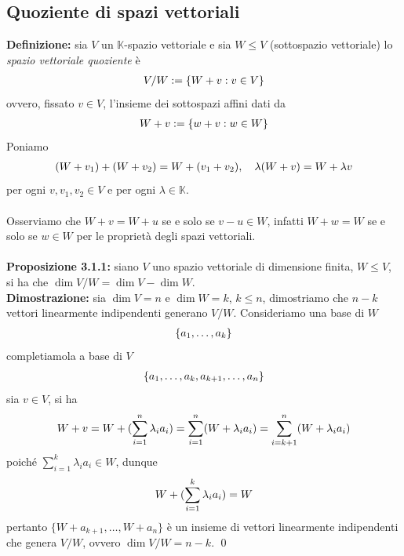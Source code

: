 \documentclass{article}
\begin{document}
\subsection{Quoziente di spazi vettoriali}
\textbf{Definizione:} sia $V$ un $\mathbb{K}$-spazio vettoriale e sia $W \leq V$ (sottospazio vettoriale) lo \textit{spazio vettoriale quoziente} è
\begin{gather}
    V/W := \{ W + v : v \in V \} \notag
\end{gather}
ovvero, fissato $v \in V$, l'insieme dei sottospazi affini dati da
\begin{gather}
    W + v := \{ w + v : w \in W \} \notag
\end{gather}
Poniamo
\begin{gather}
    (W + v_1) + (W + v_2) = W + (v_1 + v_2), \quad \lambda(W + v) = W + \lambda v \notag
\end{gather}
per ogni $v, v_1, v_2 \in V$ e per ogni $\lambda \in \mathbb{K}$. \\ \\
Osserviamo che $W + v = W + u$ se e solo se $v - u \in W$, infatti $W + w = W$ se e solo se $w \in W$ per le proprietà degli spazi vettoriali. \\ \\
\textbf{Proposizione 3.1.1:} siano $V$ uno spazio vettoriale di dimensione finita, $W \leq V$, si ha che $\dim V/W = \dim V - \dim W$. \\

\textbf{Dimostrazione:} sia $\dim V = n$ e $\dim W = k$, $k \leq n$, dimostriamo che $n - k$ vettori linearmente indipendenti generano $V/W$. Consideriamo una base di $W$
\begin{gather}
    \{ a_1, \dots, a_k \} \notag
\end{gather}
completiamola a base di $V$
\begin{gather}
    \{ a_1, \dots, a_k, a_{k + 1}, \dots, a_n \} \notag
\end{gather}
sia $v \in V$, si ha
\begin{gather}
    W + v = W + (\sum_{i = 1}^n \lambda_i a_i) = \sum_{i = 1}^n (W + \lambda_i a_i) = \sum_{i = k + 1}^n (W + \lambda_ia_i) \notag 
\end{gather}
poiché $\sum_{i = 1}^k \lambda_i a_i \in W$, dunque
\begin{gather}
    W + (\sum_{i = 1}^k \lambda_i a_i) = W \notag
\end{gather}
pertanto $\{ W + a_{k + 1}, \dots, W + a_n \}$ è un insieme di vettori linearmente indipendenti che genera $V/W$, ovvero $\dim V/W = n - k$. \qed
\end{document}
